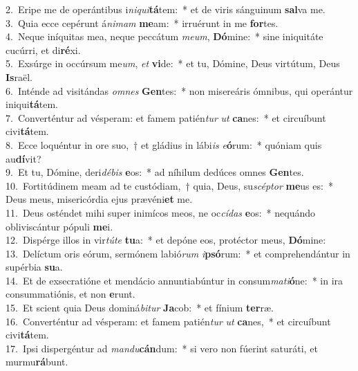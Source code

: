 {2.~}Eripe me de operántibus i\textit{ni}\textit{qui}\textbf{tá}tem:~* et de viris sánguinum \textbf{sal}va me.\\
{3.~}Quia ecce cepérunt á\textit{ni}\textit{mam} \textbf{me}am:~* irruérunt in me \textbf{for}tes.\\
{4.~}Neque iníquitas mea, neque peccátum \textit{me}\textit{um}, \textbf{Dó}mine:~* sine iniquitáte cucúrri, et di\textbf{ré}xi.\\
{5.~}Exsúrge in occúrsum me\textit{um}, \textit{et} \textbf{vi}de:~* et tu, Dómine, Deus virtútum, Deus \textbf{Is}raël.\\
{6.~}Inténde ad visitándas \textit{om}\textit{nes} \textbf{Gen}tes:~* non misereáris ómnibus, qui operántur iniqui\textbf{tá}tem.\\
{7.~}Converténtur ad vésperam: et famem patién\textit{tur} \textit{ut} \textbf{ca}nes:~* et circuíbunt civi\textbf{tá}tem.\\
{8.~}Ecce loquéntur in ore suo,~† et gládius in lábi\textit{is} \textit{e}\textbf{ó}rum:~* quóniam quis au\textbf{dí}vit?\\
{9.~}Et tu, Dómine, deri\textit{dé}\textit{bis} \textbf{e}os:~* ad níhilum dedúces omnes \textbf{Gen}tes.\\
{10.~}Fortitúdinem meam ad te custódiam,~† quia, Deus, su\textit{scép}\textit{tor} \textbf{me}us es:~* Deus meus, misericórdia ejus prævéni\textbf{et} me.\\
{11.~}Deus osténdet mihi super inimícos meos, ne oc\textit{cí}\textit{das} \textbf{e}os:~* nequándo obliviscántur pópuli \textbf{me}i.\\
{12.~}Dispérge illos in vir\textit{tú}\textit{te} \textbf{tu}a:~* et depóne eos, protéctor meus, \textbf{Dó}mine:\\
{13.~}Delíctum oris eórum, sermónem labió\textit{rum} \textit{i}\textbf{psó}rum:~* et comprehendántur in supérbia \textbf{su}a.\\
{14.~}Et de exsecratióne et mendácio annuntiabúntur in consum\textit{ma}\textit{ti}\textbf{ó}ne:~* in ira consummatiónis, et non \textbf{e}runt.\\
{15.~}Et scient quia Deus dominá\textit{bi}\textit{tur} \textbf{Ja}cob:~* et fínium \textbf{ter}ræ.\\
{16.~}Converténtur ad vésperam: et famem patién\textit{tur} \textit{ut} \textbf{ca}nes,~* et circuíbunt civi\textbf{tá}tem.\\
{17.~}Ipsi dispergéntur ad \textit{man}\textit{du}\textbf{cán}dum:~* si vero non fúerint saturáti, et murmu\textbf{rá}bunt.\\
